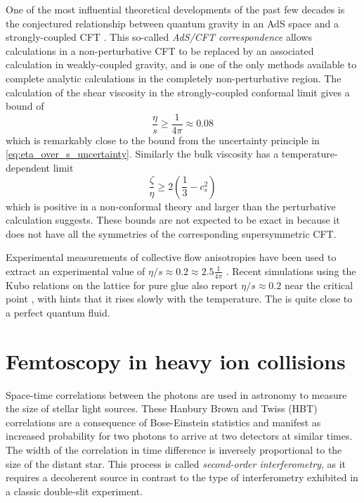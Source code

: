 One of the most influential theoretical developments of the past few decades is the conjectured relationship between quantum gravity in an \ac{AdS} space and a strongly-coupled \ac{CFT} \cite{Maldacena:1997re}.
This so-called \emph{\ac{AdS}/\ac{CFT} correspondence} allows calculations in a non-perturbative \ac{CFT} to be replaced by an associated calculation in weakly-coupled gravity, and is one of the only methods available to complete analytic calculations in the completely non-perturbative region.
The calculation of the shear viscosity in the strongly-coupled conformal limit gives a bound of \cite{Kovtun:2004de}
\begin{equation}
  \frac{\eta}{s} \geq \frac{1}{4\pi} \approx 0.08
\end{equation}
which is remarkably close to the bound from the uncertainty principle in \cref{eq:eta_over_s_uncertainty}.
Similarly the bulk viscosity has a temperature-dependent limit \cite{Buchel:2007mf}
\begin{equation}
  \frac{\zeta}{\eta} \geq 2\left(\frac{1}{3} - c_s^2 \right)
\end{equation}
which is positive in a non-conformal theory and larger than the perturbative calculation suggests. %
These bounds are not expected to be exact in \qcd because it does not have all the symmetries of the corresponding supersymmetric \ac{CFT}.

Experimental measurements of collective flow anisotropies have been used to extract an experimental value of $\eta/s \approx 0.2 \approx 2.5\frac{1}{4\pi}$ \cite{Heinz:2013th}.
Recent simulations using the Kubo relations on the lattice for pure glue also report $\eta/s \approx 0.2$ near the critical point \cite{Astrakhantsev:2017nrs}, with hints that it rises slowly with the temperature.
The \qgp is quite close to a perfect quantum fluid.


\section{Femtoscopy in heavy ion collisions}

Space-time correlations between the photons are used in astronomy to measure the size of stellar light sources.
These Hanbury Brown and Twiss (HBT) correlations \cite{HanburyBrown:1954,HanburyBrown:1956} are a consequence of Bose-Einstein statistics and manifest as increased probability for two photons to arrive at two detectors at similar times.
The width of the correlation in time difference is inversely proportional to the size of the distant star.
This process is called \emph{second-order interferometry}, as it requires a decoherent source in contrast to the type of interferometry exhibited in a classic double-slit experiment.

